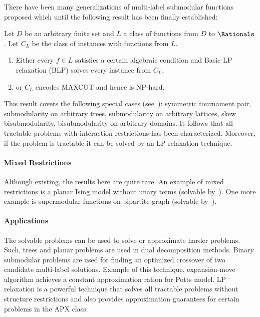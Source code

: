 There have been many generalizations of multi-label submodular functions proposed which until the following result has been finally established:
 \begin{theorem}
 Let $D$ be an arbitrary finite set and $L$ a class of functions from $D$ to $\Rationals$. Let $C_L$ be the class of instances with functions from $L$.
 \begin{enumerate}
 \item Either every $f \in L$ satisfies a certain algebraic condition
 and Basic LP relaxation (BLP) solves every instance from $C_L$,
 \item or $C_L$ encodes MAXCUT and hence is NP-hard.
 \end{enumerate}
 \end{theorem}
This result covers the following special cases (see~\cite{Thapper-13}): symmetric tournament pair, submodularity on arbitrary trees, submodularity on arbitrary lattices, skew bisubmodularity, bisubmodularity on arbitrary domains. It follows that all tractable problems with interaction restrictions has been characterized. Moreover, if the problem is tractable it can be solved by an LP relaxation technique.
\paragraph{Mixed Restrictions}
Although existing, the results here are quite rare. An example of mixed restrictions is a planar Ising model without unary terms (solvable by~\cite{Shih-90}). One more example is supermodular functions on bipartite graph (solvable by~\citet{DSchlesinger-07-permuted}).

\paragraph{Applications} 
The solvable problems can be used to solve or approximate harder problems. Such, trees and planar problems are used in dual decomposition methods.  Binary submodular problems are used for finding an optimized crossover of two candidate multi-label solutions. Example of this technique, expansion-move algorithm achieves a constant approximation ration for Potts model. LP relaxation is a powerful technique that solves all tractable problems without structure restrictions and also provides approximation guarantees for certain problems in the APX class.


